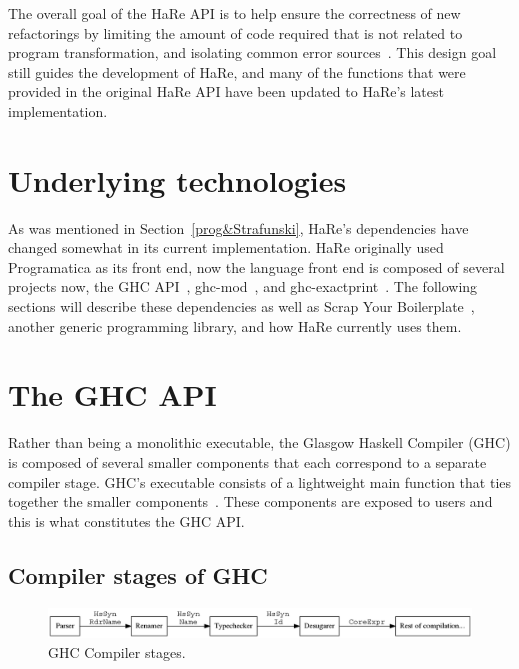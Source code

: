 The overall goal of the HaRe API is to help ensure the correctness of new refactorings by limiting the amount of code required that is not related to program transformation, and isolating common error sources~\citep{hareApi}. This design goal still guides the development of HaRe, and many of the functions that were provided in the original HaRe API have been updated to HaRe's latest implementation. 
 
\section{Underlying technologies}

As was mentioned in Section~\ref{prog&Strafunski}, HaRe's dependencies have changed somewhat in its current implementation. HaRe originally used Programatica as its front end, now the language front end is composed of several projects now, the GHC API~\citep{ghcApi}, ghc-mod~\citep{ghcMod}, and ghc-exactprint~\citep{exactprint}. The following sections will describe these dependencies as well as Scrap Your Boilerplate~\citep{syb}, another generic programming library, and how HaRe currently uses them.

\section{The GHC API}
\label{ghcApi}

Rather than being a monolithic executable, the Glasgow Haskell Compiler (GHC) is composed of several smaller components that each correspond to a separate compiler stage. GHC's executable consists of a lightweight main function that ties together the smaller components~\citep{ghcDesign}. These components are exposed to users  and this is what constitutes the GHC API.

\subsection{Compiler stages of GHC}\label{ghcStages}

\begin{figure}[t]
	\begin{center}
		\includegraphics[scale=.4]{graphVis/Chapter2/compilerStgs.png}
	\end{center}
	\caption{GHC Compiler stages.}
	\label{compilerStages}
\end{figure}

